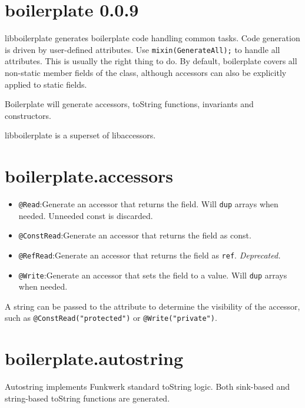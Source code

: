 \newcommand{\lstitem}[1]{\item \lstinline{#1}:\linebreak[4]}

\section*{boilerplate 0.0.9}

libboilerplate generates boilerplate code handling common tasks. Code generation is driven by user-defined attributes.
Use \lstinline{mixin(GenerateAll);} to handle all attributes. This is usually the right thing to do.
By default, boilerplate covers all non-static member fields of the class, although accessors can also be
explicitly applied to static fields.

Boilerplate will generate accessors, toString functions, invariants and constructors.


libboilerplate is a superset of libaccessors.

\vspace*{\fill}

\section*{boilerplate.accessors}
\begin{itemize}\raggedright
\lstitem{@Read} Generate an accessor that returns the field. Will \lstinline{dup} arrays when needed. Unneeded const is discarded.
\lstitem{@ConstRead} Generate an accessor that returns the field as const.
\lstitem{@RefRead} Generate an accessor that returns the field as \lstinline{ref}. \emph{Deprecated.}
\lstitem{@Write} Generate an accessor that sets the field to a value. Will \lstinline{dup} arrays when needed.
\end{itemize}

A string can be passed to the attribute to determine the visibility of the accessor, such as
\lstinline{@ConstRead("protected")} or \lstinline{@Write("private")}.

\vspace*{\fill}

\section*{boilerplate.autostring}
Autostring implements Funkwerk standard toString logic.
Both sink-based and string-based toString functions are generated.


